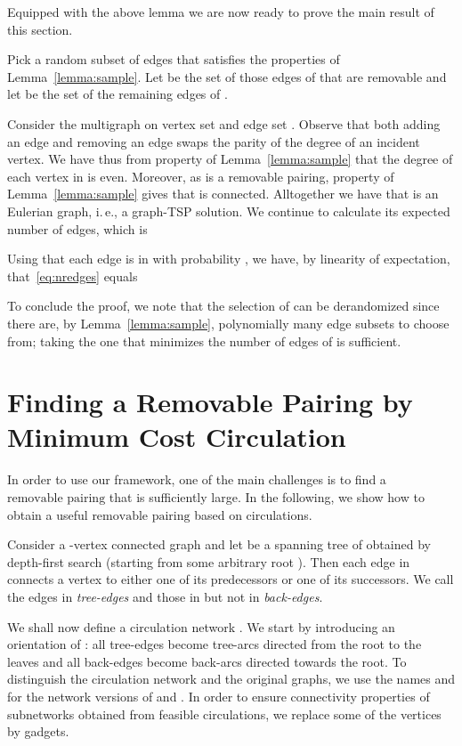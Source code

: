 \documentclass[letterpaper,11pt]{article}
\newenvironment{proofof}[1]{\begin{trivlist}
    \item[\hskip\labelsep {\bf Proof of #1.}]}{\QED \end{trivlist}}
\newcommand{\QED}{\hfill }
\newcommand{\MS}{\ensuremath{\mbox{removable pairing}}\xspace}
\newcommand{\TSP}{graph-TSP\xspace}
\begin{document}
Equipped with the above lemma we are now ready to prove the main result
of this section.
\begin{proofof}{Theorem~\ref{thm:main}}
  Pick a random subset  of edges that satisfies the
  properties of Lemma~\ref{lemma:sample}. Let  be the set of those edges of
   that are removable and let  be the set of the remaining edges of
  .

Consider the multigraph  on vertex set  and edge set . Observe that both adding an edge and
removing an edge swaps the parity of the degree of an incident
vertex. We have thus from property  of Lemma~\ref{lemma:sample}
that the degree of each vertex in  is even. Moreover, as  is a
removable pairing, property  of Lemma~\ref{lemma:sample}
gives that  is connected. Alltogether we have that  is an
Eulerian graph, i.\,e., a \TSP{} solution. We continue to calculate its
expected number of edges, which is
 
Using that each edge is in  with probability ,  we have, by linearity of
expectation, that~\eqref{eq:nredges} equals
 

To conclude the proof, we note that the selection of  can be
derandomized since there are, by Lemma~\ref{lemma:sample},
polynomially many edge subsets to choose from; taking the one that
minimizes the number of edges of   is sufficient.
\end{proofof}

\section{Finding a Removable Pairing by Minimum Cost Circulation}\label{sec:circulation}
In order to use our framework, one of the main challenges is to find a
\MS{} that is sufficiently large. In the following, we show how to obtain a
useful \MS{} based on circulations.

Consider a -vertex connected graph  and let  be a spanning
tree of  obtained by depth-first search (starting from some
arbitrary root ). Then each edge in  connects a vertex to either
one of its predecessors or one of its successors. We call the edges in
 \emph{tree-edges} and those in  but not in 
\emph{back-edges}.

We shall now define a circulation network .
We start
by introducing an orientation of : all tree-edges
become tree-arcs directed from the root to the leaves and all 
back-edges become back-arcs directed towards the root. To distinguish the circulation
network and the original graphs, we use the names  and  for the
network versions of  and .  In order to ensure connectivity properties of
subnetworks obtained from feasible circulations, we replace some of the vertices
by gadgets. 
\end{document}
